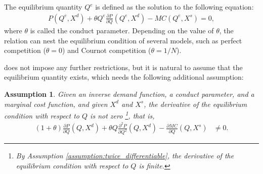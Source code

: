 \documentclass[11pt, a4paper]{article}
\newtheorem{assumption}{Assumption}
\theoremstyle{remark}
\begin{document}
The equilibrium quantity $Q^e$ is defined as the solution to the following equation:
\begin{align}
    P(Q^e, X^{d}) + \theta Q^e\frac{\partial P}{\partial Q}(Q^e, X^{d}) - MC(Q^e, X^{s}) = 0, \label{eq:foc}
\end{align}
where $\theta$ is called the conduct parameter.
Depending on the value of $\theta$, the relation can nest the equilibrium condition of several models, such as perfect competition ($\theta=0$) and Cournot competition ($\theta=1/N$).

\citet{lau1982identifying} does not impose any further restrictions, but it is natural to assume that the equilibrium quantity exists, which needs the following additional assumption:
\begin{assumption}\label{assumption:unique_equilibrium}
    Given an inverse demand function, a conduct parameter, and a marginal cost function, and given $X^{d}$ and $X^{s}$, the derivative of the equilibrium condition with respect to $Q$ is not zero \footnote{By Assumption \ref{assumption:twice_differentiable}, the derivative of the equilibrium condition with respect to $Q$ is finite.}, that is,
    \begin{align}
        (1+\theta)\frac{\partial P}{\partial Q}(Q, X^{d}) + \theta Q\frac{\partial^2 P}{\partial Q^2}(Q, X^{d}) - \frac{\partial MC}{\partial Q}(Q, X^{s}) & \ne 0.
    \end{align}
\end{assumption}


\end{document}
